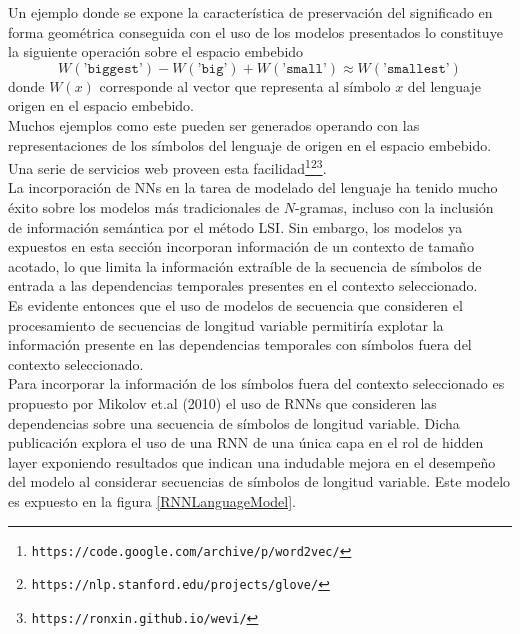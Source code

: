 \documentclass{article}
\begin{document}
	Un ejemplo donde se expone la característica de preservación del significado en forma geométrica conseguida con el uso de los modelos presentados lo constituye la siguiente operación sobre el espacio embebido\\
	\begin{equation*}
	W(\texttt{'biggest'}) -W(\texttt{'big'})+W(\texttt{'small'}) \approx W(\texttt{'smallest'})
	\end{equation*}
	donde $W(x)$ corresponde al vector que representa al símbolo $x$ del lenguaje origen en el espacio embebido.\\
	Muchos ejemplos como este pueden ser generados operando con las representaciones de los símbolos del lenguaje de origen en el espacio embebido. Una serie de servicios web proveen esta facilidad\footnote{\texttt{https://code.google.com/archive/p/word2vec/}}\footnote{\texttt{https://nlp.stanford.edu/projects/glove/}}\footnote{\texttt{https://ronxin.github.io/wevi/}}.\\
	
	La incorporación de NNs en la tarea de modelado del lenguaje ha tenido mucho éxito sobre los modelos más tradicionales de $N$-gramas, incluso con la inclusión de información semántica por el método LSI\cite{37BengioNeuralEmbedding}. Sin embargo, los modelos ya expuestos en esta sección incorporan información de un contexto de tamaño acotado, lo que limita la información extraíble de la secuencia de símbolos de entrada a las dependencias temporales presentes en el contexto seleccionado.\\
	Es evidente entonces que el uso de modelos de secuencia que consideren el procesamiento de secuencias de longitud variable permitiría explotar la información presente en las dependencias temporales con símbolos fuera del contexto seleccionado.\\
	Para incorporar la información de los símbolos fuera del contexto seleccionado es propuesto por Mikolov et.al (2010)\cite{49RNNLanguageModel} el uso de RNNs que consideren las dependencias sobre una secuencia de símbolos de longitud variable. Dicha publicación explora el uso de una RNN de una única capa en el rol de hidden layer exponiendo resultados que indican una indudable mejora en el desempeño del modelo al considerar secuencias de símbolos de longitud variable. Este modelo es expuesto en la figura \ref{RNNLanguageModel}.\\
	
\end{document}
